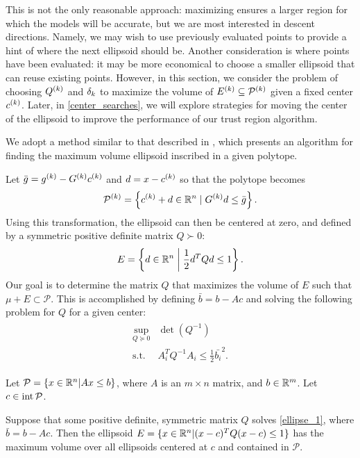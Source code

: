 \documentclass{article}
\begin{document}
This is not the only reasonable approach: maximizing ensures a larger region for which the models will be accurate, 
but we are most interested in descent directions.
Namely, we may wish to use previously evaluated points to provide a hint of where the next ellipsoid should be.
Another consideration is where points have been evaluated: it may be more economical to choose a smaller ellipsoid that can reuse existing points.
However, in this section,  we consider the problem of choosing ${Q^{(k)}}$ and $\delta_k$ to maximize the volume of ${E^{(k)}} \subseteq {{\mathcal{P}}^{(k)}}$ given a fixed center $c^{(k)}$.
Later, in \cref{center_searches}, we will explore strategies for moving the center of the ellipsoid to improve the performance of our trust region algorithm.

We adopt a method similar to that described in \cite{Khachiyan1993},
which presents an algorithm for finding the maximum volume ellipsoid inscribed in a given polytope.

Let $\bar g = {g^{(k)}} - G^{(k)} c^{(k)}$ and $d = x - c^{(k)}$ so that the polytope becomes
\begin{align*}
{{\mathcal{P}}^{(k)}} = \left\{ c^{(k)} + d \in \mathbb R^n \; | \;  G^{(k)} d \le \bar{g} \right\}.
\end{align*}
Using this transformation, the ellipsoid can then be centered at zero, and defined by a symmetric positive definite matrix $Q \succ 0$:
\begin{align*}
E = \left\{ d \in \mathbb R^n \; \bigg | \; \frac 1 2 d^T Q d \le 1 \right\}.
\end{align*}
Our goal is to determine the matrix $Q$ that maximizes the volume of $E$ such that $\mu + E \subset \mathcal{P}$.
This is accomplished by defining $\bar b = b - Ac$ and solving the following problem for $Q$ for a given center:
 \begin{align}
\begin{array}{cc}
 \sup_{Q \succeq 0} & \det(Q^{-1})  \\
 \textrm{s.t.} & A_i^T Q^{-1} A_i \le \frac 1 2 \bar{b_i}^2.
\end{array}
 \label{ellipse_1}
\end{align}


\begin{theorem} 

Let $\mathcal{P} = \{x \in \mathbb R^n | Ax \le b\}$, 
where $A$ is an $m \times n$ matrix, 
and $b \in \mathbb R^m$.  Let $c \in \operatorname{int}{\mathcal{P}}$.

Suppose that some positive definite, symmetric matrix $Q$ solves \cref{ellipse_1}, where $\bar{b} = b - Ac$.
Then the ellipsoid $E = \{ x \in \mathbb R^n | (x-c)^T Q(x-c) \le 1\}$ has the maximum volume over all ellipsoids centered at $c$ and contained in $\mathcal{P}$.
\end{theorem}
\end{document}
